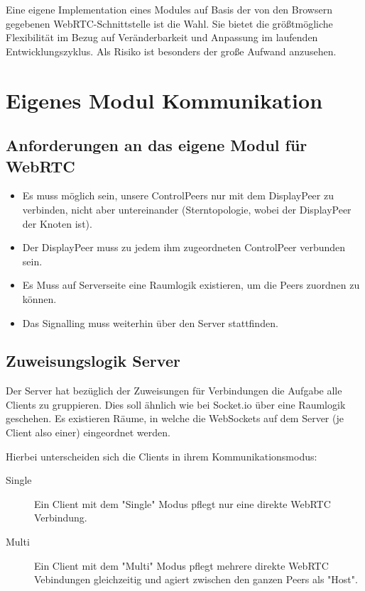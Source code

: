 Eine eigene Implementation eines Modules auf Basis der von den Browsern gegebenen WebRTC-Schnittstelle ist die Wahl. 
Sie bietet die größtmögliche Flexibilität im Bezug auf Veränderbarkeit und Anpassung im laufenden Entwicklungszyklus. 
Als Risiko ist besonders der große Aufwand anzusehen.



\section{Eigenes Modul Kommunikation}

\subsection{Anforderungen an das eigene Modul für WebRTC}
\begin{itemize}
\item 
Es muss möglich sein, unsere ControlPeers nur mit dem DisplayPeer zu verbinden, 
nicht aber untereinander (Sterntopologie, wobei der DisplayPeer der Knoten ist).

\item
Der DisplayPeer muss zu jedem ihm zugeordneten ControlPeer verbunden sein.

\item
Es Muss auf Serverseite eine Raumlogik existieren, um die Peers zuordnen zu 
können.

\item
Das Signalling muss weiterhin über den Server stattfinden.
\end{itemize}



\subsection{Zuweisungslogik Server}
Der Server hat bezüglich der Zuweisungen für Verbindungen die Aufgabe alle 
Clients zu gruppieren. Dies soll ähnlich wie bei Socket.io über eine Raumlogik 
geschehen. Es existieren Räume, in welche die WebSockets auf dem Server (je Client 
also einer) eingeordnet werden.


Hierbei unterscheiden sich die Clients in ihrem Kommunikationsmodus:
\begin{description}
\item[Single]
Ein Client mit dem "Single" Modus pflegt nur eine direkte WebRTC Verbindung.

\item[Multi]
Ein Client mit dem "Multi" Modus pflegt mehrere direkte WebRTC Vebindungen 
gleichzeitig und agiert zwischen den ganzen Peers als "Host".
\end{description}

